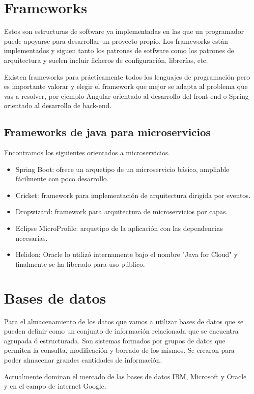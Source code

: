 \documentclass[12pt]{report} %
\begin{document}
\section{Frameworks}
  Estos son estructuras de software ya implementadas en las que un programador puede apoyarse para desarrollar un proyecto propio. Los frameworks están implementados y siguen tanto los patrones de sotfware como los patrones de arquitectura y suelen incluir ficheros de configuración, librerías, etc.
 
 Existen frameworks para prácticamente todos los lenguajes de programación pero es importante valorar y elegir el framework que mejor se adapta al problema que vas a resolver, por ejemplo Angular orientado al desarrollo del front-end o Spring orientado al desarrollo de back-end.
 
 \subsection{Frameworks de java para microservicios}
 Encontramos los siguientes orientados a microservicios.
 \begin{itemize}
 	\item Spring Boot: ofrece un arquetipo de un microservicio básico, ampliable fácilmente con poco desarrollo. 
 	\item Cricket: framework para implementación de arquitectura dirigida por eventos.
 	\item Dropwizard: framework para arquitectura de microservicios por capas.
 	\item Eclipse MicroProfile: arquetipo de la aplicación con las dependencias necesarias.
 	\item Helidon: Oracle lo utilizó internamente bajo el nombre "Java for Cloud" y finalmente se ha liberado para uso público. 
 \end{itemize}
	
	\section{Bases de datos}
	Para el almacenamiento de los datos que vamos a utilizar bases de datos que se pueden definir como un conjunto de información relacionada que se encuentra agrupada ó estructurada. Son sistemas formados por grupos de datos que permiten la consulta, modificación y borrado de los mismos. Se crearon para poder almacenar grandes cantidades de información. 
	
	Actualmente dominan el mercado de las bases de datos IBM, Microsoft y Oracle y en el campo de internet Google.
	
\end{document}
